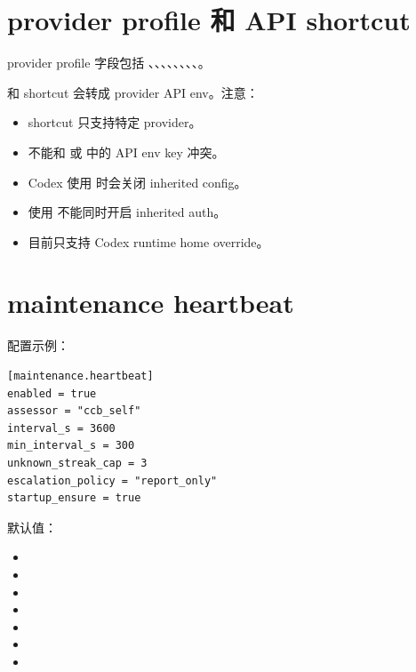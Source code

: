 \section{provider profile 和 API shortcut}

provider profile 字段包括 、、、、、、、、。

 和  shortcut 会转成 provider API env。注意：

\begin{itemize}
  \item shortcut 只支持特定 provider。
  \item 不能和  或  中的 API env key 冲突。
  \item Codex 使用  时会关闭 inherited config。
  \item 使用  不能同时开启 inherited auth。
  \item {} 目前只支持 Codex runtime home override。
\end{itemize}

\section{maintenance heartbeat}

配置示例：

\begin{lstlisting}
[maintenance.heartbeat]
enabled = true
assessor = "ccb_self"
interval_s = 3600
min_interval_s = 300
unknown_streak_cap = 3
escalation_policy = "report_only"
startup_ensure = true
\end{lstlisting}

默认值：

\begin{itemize}
  \item {}
  \item {}
  \item {}
  \item {}
  \item {}
  \item {}
  \item {}
\end{itemize}

